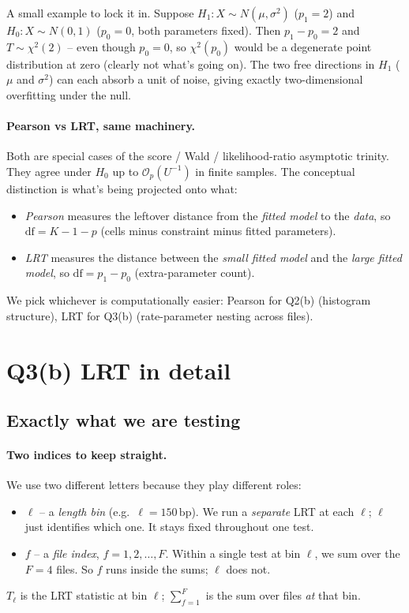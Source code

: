 \documentclass[11pt]{article}
\begin{document}
A small example to lock it in. Suppose $H_1: X \sim N(\mu, \sigma^2)$
($p_1 = 2$) and $H_0: X \sim N(0, 1)$ ($p_0 = 0$, both parameters fixed).
Then $p_1 - p_0 = 2$ and $T \sim \chi^{2}(2)$ -- even though $p_0 = 0$,
so $\chi^{2}(p_0)$ would be a degenerate point distribution at zero
(clearly not what's going on). The two free directions in $H_1$ ($\mu$ and
$\sigma^2$) can each absorb a unit of noise, giving exactly
two-dimensional overfitting under the null.

\paragraph{Pearson vs LRT, same machinery.}
Both are special cases of the score / Wald / likelihood-ratio asymptotic
trinity. They agree under $H_0$ up to $\mathcal{O}_p(U^{-1})$ in finite
samples. The conceptual distinction is what's being projected onto what:
\begin{itemize}[leftmargin=2em,itemsep=2pt]
\item \emph{Pearson} measures the leftover distance from the \emph{fitted
       model} to the \emph{data}, so $\mathrm{df} = K - 1 - p$ (cells
       minus constraint minus fitted parameters).
\item \emph{LRT} measures the distance between the \emph{small fitted
       model} and the \emph{large fitted model}, so $\mathrm{df} = p_1 - p_0$
       (extra-parameter count).
\end{itemize}
We pick whichever is computationally easier: Pearson for Q2(b) (histogram
structure), LRT for Q3(b) (rate-parameter nesting across files).

\section{Q3(b) LRT in detail}

\subsection{Exactly what we are testing}

\paragraph{Two indices to keep straight.}
We use two different letters because they play different roles:
\begin{itemize}[leftmargin=2em,itemsep=2pt]
\item $\ell$ -- a \emph{length bin} (e.g.\ $\ell = 150\,\text{bp}$). We run
       a \emph{separate} LRT at each $\ell$; $\ell$ just identifies which
       one. It stays fixed throughout one test.
\item $f$ -- a \emph{file index}, $f = 1, 2, \dots, F$. Within a single test
       at bin $\ell$, we sum over the $F = 4$ files. So $f$ runs inside the
       sums; $\ell$ does not.
\end{itemize}
$T_\ell$ is the LRT statistic at bin $\ell$; $\sum_{f=1}^{F}$ is the sum
over files \emph{at} that bin.
\end{document}
